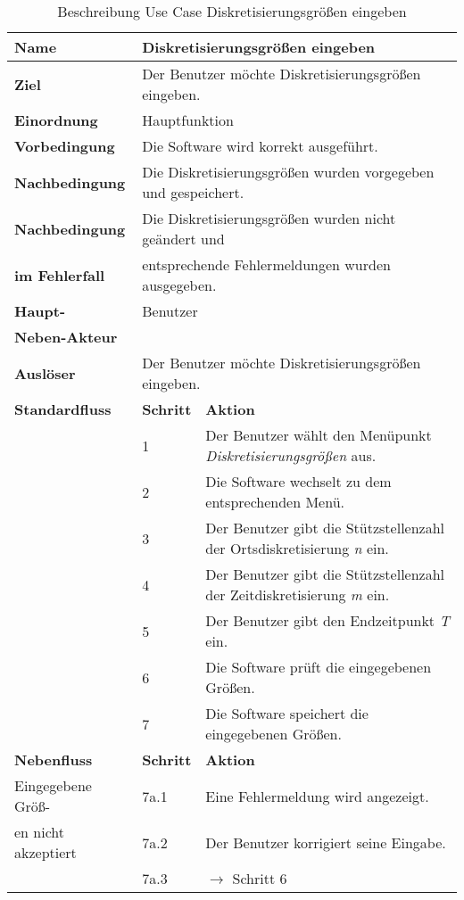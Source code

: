 \begin{table} [H]
	\centering
	\begin{tabular}{|l|l|l|}
		\hline
		\textbf{Name} 			& \multicolumn{2}{|l|}{Diskretisierungsgrößen eingeben}  \\
		\hline
		\textbf{Ziel} 			& \multicolumn{2}{|l|}{Der Benutzer möchte Diskretisierungsgrößen eingeben. }\\ 
		\hline
		\textbf{Einordnung}		& \multicolumn{2}{|l|}{Hauptfunktion}\\
		\hline
		\textbf{Vorbedingung}	& \multicolumn{2}{|l|}{Die Software wird korrekt ausgeführt.} \\
		\hline
		\textbf{Nachbedingung}	& \multicolumn{2}{|l|}{Die Diskretisierungsgrößen wurden vorgegeben und gespeichert.}\\
		\hline
		\textbf{Nachbedingung} 	& \multicolumn{2}{|l|}{Die Diskretisierungsgrößen wurden nicht geändert und}\\
		\textbf{im Fehlerfall}	& \multicolumn{2}{|l|}{entsprechende Fehlermeldungen wurden ausgegeben.}\\
		\hline
		\textbf{Haupt-} 		& \multicolumn{2}{|l|}{Benutzer}\\
		\textbf{Neben-Akteur}	& \multicolumn{2}{|l|}{	}			\\
		\hline
		\textbf{Auslöser} 		& \multicolumn{2}{|l|}{Der Benutzer möchte Diskretisierungsgrößen eingeben.} \\
		\hline 
		\textbf{Standardfluss} & \textbf{Schritt} & \textbf{Aktion} \\
		\hline
		&	1	& Der Benutzer wählt den Menüpunkt \emph{Diskretisierungsgrößen} aus. \\
		\cline{2-3}
		&	2	& Die Software wechselt zu dem entsprechenden Menü.\\
		\cline{2-3}
		&	3	& Der Benutzer gibt die Stützstellenzahl der Ortsdiskretisierung \emph{n} ein.\\
		\cline{2-3}
		&	4	& Der Benutzer gibt die Stützstellenzahl der Zeitdiskretisierung \emph{m} ein.\\
		\cline{2-3}
		&	5	& Der Benutzer gibt den Endzeitpunkt \emph{T} ein.\\
		\cline{2-3}
		&	6	& Die Software prüft die eingegebenen Größen.\\
		\cline{2-3}
		&	7	& Die Software speichert die eingegebenen Größen.\\
		\hline
		\textbf{Nebenfluss} & \textbf{Schritt} & \textbf{Aktion}\\
		\hline
		Eingegebene Größ-  & 7a.1 & Eine Fehlermeldung wird angezeigt.\\
		\cline{2-3}
		en nicht akzeptiert & 7a.2	& Der Benutzer korrigiert seine Eingabe.\\
		\cline{2-3}
					& 7a.3 	& $\rightarrow$ Schritt 6\\
		\hline
	\end{tabular}
	\caption{Beschreibung Use Case Diskretisierungsgrößen eingeben}
	\label{Beschreibung Use Case Diskretisierungsgrössen_eingeben}
\end{table}


